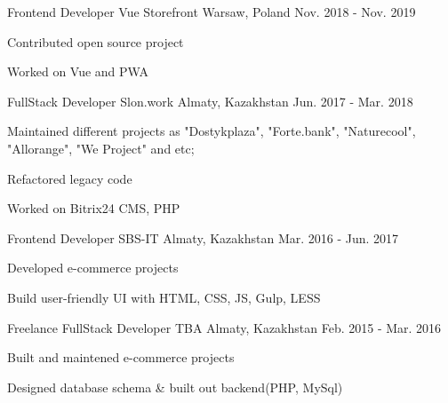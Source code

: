\begin{cventries}
  \cventry
    {Frontend Developer} %
    {Vue Storefront} %
    {Warsaw, Poland} %
    {Nov. 2018 - Nov. 2019} %
    {
      \begin{cvitems} %
        \item {Contributed open source project}
        \item {Worked on Vue and PWA}
      \end{cvitems}
    }

  \cventry
    {FullStack Developer} %
    {Slon.work} %
    {Almaty, Kazakhstan} %
    {Jun. 2017 - Mar. 2018} %
    {
      \begin{cvitems} %
        \item {Maintained different projects as "Dostykplaza", "Forte.bank", "Naturecool", "Allorange", "We Project" and etc;}
        \item {Refactored legacy code}
        \item {Worked on Bitrix24 CMS, PHP}
      \end{cvitems}
    }

  \cventry
    {Frontend Developer} %
    {SBS-IT} %
    {Almaty, Kazakhstan} %
    {Mar. 2016 - Jun. 2017} %
    {
      \begin{cvitems} %
        \item {Developed e-commerce projects}
        \item {Build user-friendly UI with HTML, CSS, JS, Gulp, LESS}
      \end{cvitems}
    }

  \cventry
    {Freelance FullStack Developer} %
    {TBA} %
    {Almaty, Kazakhstan} %
    {Feb. 2015 - Mar. 2016} %
    {
      \begin{cvitems} %
        \item {Built and maintened e-commerce projects}
        \item {Designed database schema & built out backend(PHP, MySql)}
      \end{cvitems}
    }

\end{cventries}
